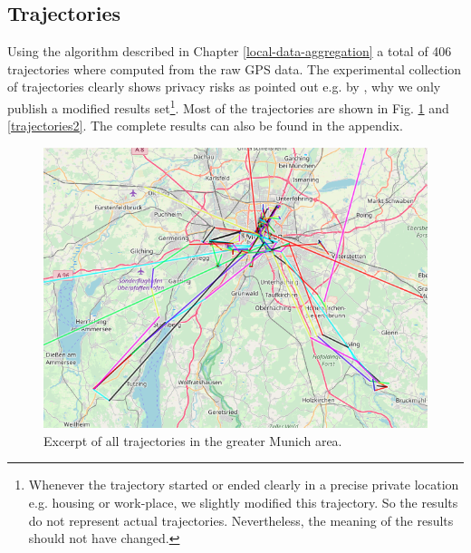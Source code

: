 \subsection{Trajectories}\label{trajectories}
Using the algorithm described in Chapter \ref{local-data-aggregation} a total of 406 trajectories where computed from the raw GPS data. The experimental collection of trajectories clearly shows privacy risks as pointed out e.g. by \parencite{cellphone}, why we only publish a modified results set\footnote{Whenever the trajectory started or ended clearly in a precise private location e.g. housing or work-place, we slightly modified this trajectory. So the results do not represent actual trajectories. Nevertheless, the meaning of the results should not have changed.}. Most of the trajectories are shown in Fig. \ref{trajectories1} and \ref{trajectories2}. The complete results can also be found in the appendix.

\begin{figure}[h!]
	\includegraphics[width=\textwidth]{data/trajectories-2.png}
	\caption{Excerpt of all trajectories in the greater Munich area.}
	\label{trajectories1}
\end{figure}

